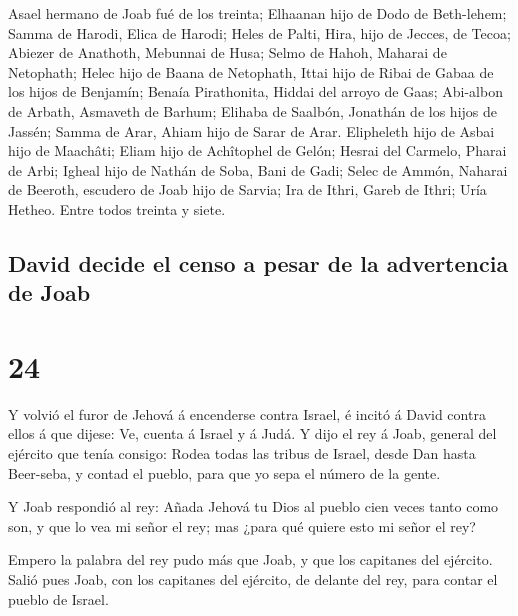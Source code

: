  Asael hermano de Joab fué de los treinta; Elhaanan hijo
de Dodo de Beth-lehem;  Samma de Harodi, Elica de Harodi;
 Heles de Palti, Hira, hijo de Jecces, de Tecoa;
 Abiezer de Anathoth, Mebunnai de Husa; 
Selmo de Hahoh, Maharai de Netophath;  Helec hijo de
Baana de Netophath, Ittai hijo de Ribai de Gabaa de los hijos de
Benjamín;  Benaía Pirathonita, Hiddai del arroyo de Gaas;
 Abi-albon de Arbath, Asmaveth de Barhum; 
Elihaba de Saalbón, Jonathán de los hijos de Jassén; 
Samma de Arar, Ahiam hijo de Sarar de Arar.  Elipheleth
hijo de Asbai hijo de Maachâti; Eliam hijo de Achîtophel de Gelón;
 Hesrai del Carmelo, Pharai de Arbi; 
Igheal hijo de Nathán de Soba, Bani de Gadi;  Selec de
Ammón, Naharai de Beeroth, escudero de Joab hijo de Sarvia;
 Ira de Ithri, Gareb de Ithri;  Uría
Hetheo. Entre todos treinta y siete.

\hypertarget{david-decide-el-censo-a-pesar-de-la-advertencia-de-joab}{%
\subsection{David decide el censo a pesar de la advertencia de
Joab}\label{david-decide-el-censo-a-pesar-de-la-advertencia-de-joab}}

\hypertarget{section-10-24}{%
\section{24}\label{section-10-24}}

 Y volvió el furor de Jehová á encenderse contra Israel, é
incitó á David contra ellos á que dijese: Ve, cuenta á Israel y á Judá.
 Y dijo el rey á Joab, general del ejército que tenía
consigo: Rodea todas las tribus de Israel, desde Dan hasta Beer-seba, y
contad el pueblo, para que yo sepa el número de la gente.

 Y Joab respondió al rey: Añada Jehová tu Dios al pueblo
cien veces tanto como son, y que lo vea mi señor el rey; mas ¿para qué
quiere esto mi señor el rey?

 Empero la palabra del rey pudo más que Joab, y que los
capitanes del ejército. Salió pues Joab, con los capitanes del ejército,
de delante del rey, para contar el pueblo de Israel.

